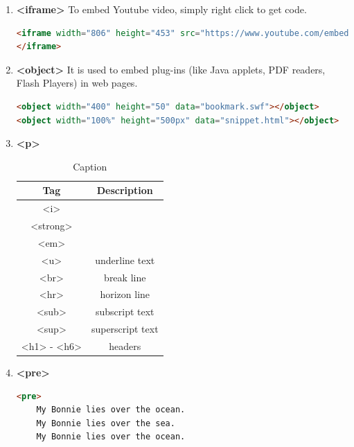 \documentclass[12pt, a4paper]{report}
\begin{document}
\begin{enumerate}
        \item \textbf{<iframe>}
        To embed Youtube video, simply right click to get code.
        \begin{lstlisting}[language=HTML]
<iframe width="806" height="453" src="https://www.youtube.com/embed/V1ejrlYY1Qs?list=LL7CoUzO3ZFpw-UbKQhDRweA" frameborder="0" allow="accelerometer; autoplay; encrypted-media; gyroscope; picture-in-picture" allowfullscreen>
</iframe>
        \end{lstlisting}
        
        \item \textbf{<object>}
        It is used to embed plug-ins (like Java applets, PDF readers, Flash Players) in web pages. \citep{html5}
        \begin{lstlisting}[language=HTML]
<object width="400" height="50" data="bookmark.swf"></object>
<object width="100%" height="500px" data="snippet.html"></object>
        \end{lstlisting}
        
        
        \item \textbf{<p>}
        \begin{table}[H]
            \centering
            \begin{tabular}{c|c}
                \toprule
                Tag & Description \\
                \hline
                <i> &  \\
                \hline
                <strong> &  \\
                \hline
                <em> & \\
                \hline
                <u> & underline text \\
                \hline
                <br> & break line \\
                \hline 
                <hr> & horizon line \\
                \hline
                <sub> & subscript text \\
                \hline 
                <sup> & superscript text \\
                <h1> - <h6> & headers \\
                \bottomrule
            \end{tabular}
            \caption{Caption}
            \label{tab:my_label}
        \end{table}
        
        \item \textbf{<pre>}
        \begin{lstlisting}[language=HTML]
<pre>
    My Bonnie lies over the ocean.
    My Bonnie lies over the sea.
    My Bonnie lies over the ocean.
        

\end{lstlisting}
\end{enumerate}
\end{document}

